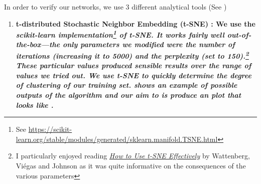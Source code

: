 In order to verify our networks, we use 3 different analytical tools (See \href{https://github.com/nicholaspun/IZ-Net/blob/master/faceRecognition/analysis.py}{})
\begin{enumerate}
    \item \bf{t-distributed Stochastic Neighbor Embedding} (t-SNE) \cite{tSNEPaper}: 
    We use the \it{scikit-learn} implementation\footnote{See \url{https://scikit-learn.org/stable/modules/generated/sklearn.manifold.TSNE.html}} of t-SNE.
    It works fairly well out-of-the-box---the only parameters we modified were the number of iterations (increasing it to 5000) and the perplexity (set to 150).\footnote{I particularly enjoyed reading \href{https://distill.pub/2016/misread-tsne/}{\it{How to Use t-SNE Effectively}} by Wattenberg, Vi\'{e}gas and Johnson as it was quite informative on the consequences of the various parameters}
    These particular values produced sensible results over the range of values we tried out.
    We use t-SNE to quickly determine the degree of clustering of our training set.
     shows an example of possible outputs of the algorithm and our aim to is produce an plot that looks like .
    

\end{enumerate}
